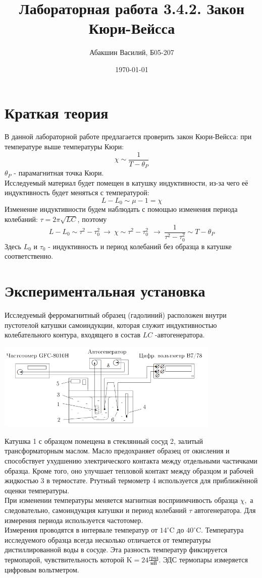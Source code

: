 \documentclass[a4paper, 12pt]{article}
\title{Лабораторная работа 3.4.2. Закон Кюри-Вейсса}
\author{Абакшин Василий, Б05-207}
\date{\today}
\begin{document}
	\maketitle
	
	\section*{Краткая теория}
	В данной лабораторной работе предлагается проверить закон Кюри-Вейсса: при температуре выше температуры Кюри:
	\[\chi \sim \frac{1}{T - \theta_P}\]
	$\theta_P$ - парамагнитная точка Кюри.\\
	Исследуемый материал будет помещен в катушку индуктивности, из-за чего её индуктивность будет меняться с температурой:
	\[L - L_0 \sim \mu - 1 = \chi\]
	Изменение индуктивности будем наблюдать с помощью изменения периода колебаний: $\tau = 2\pi\sqrt{LC}$, поэтому 
	\[L - L_0 \sim \tau^2 - \tau_0^2 \ \rightarrow \ \chi \sim \tau^2 - \tau_0^2 \ \ \rightarrow \ \frac{1}{\tau^2 - \tau_0^2} \sim T - \theta_P\]
	Здесь $L_0$ и $\tau_0$ - индуктивность и период колебаний без образца в катушке соответственно.
	\section*{Экспериментальная установка}
	
	Исследуемый ферромагнитный образец (гадолиний) расположен внутри пустотелой катушки самоиндукции, которая служит индуктивностью колебательного контура, входящего в состав $L C$ -автогенератора.
	
	\begin{center}
		\includegraphics[width=0.8\textwidth]{1.png}
		\label{pic1}
	\end{center}
	Катушка 1 с образцом помещена в стеклянный сосуд 2, залитый трансформаторным маслом. Масло предохраняет образец от окисления и способствует ухудшению электрического контакта между отдельными частичками образца. Кроме того, оно улучшает тепловой контакт между образцом и рабочей жидкостью 3 в термостате. Ртутный термометр 4 используется для приближённой оценки температуры.\\
	При изменении температуры меняется магнитная восприимчивость образца $\chi,$ а следовательно, самоиндукция катушки и период колебаний $\tau$ автогенератора. Для измерения периода используется частотомер. \\
	Измерения проводятся в интервале температур от $14^{\circ} \mathrm{C}$ до $40^{\circ} \mathrm{C} .$ 
	Температура исследуемого образца всегда несколько отличается от температуры дистиллированной воды в сосуде. Эта разность температур фиксируется термопарой, чувствительность которой $\mathrm{K}=24\frac{\text{град}}{\text{мВ}}$. ЭДС термопары измеряется цифровым вольтметром.
	
\end{document}
